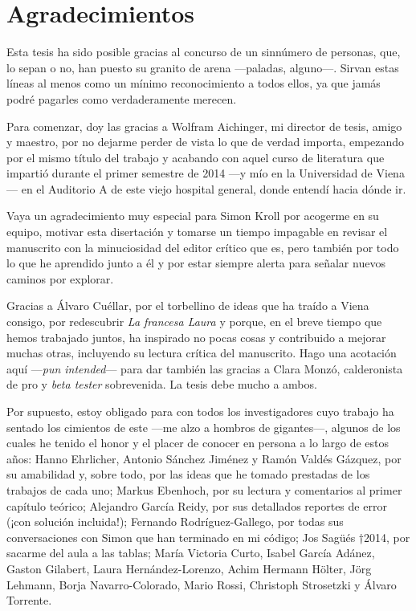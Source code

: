 \chapter*{Agradecimientos}

Esta tesis ha sido posible gracias al concurso de un sinnúmero de personas, que, lo sepan o no, han puesto su granito de arena —paladas, alguno—. Sirvan estas líneas al menos como un mínimo reconocimiento a todos ellos, ya que jamás podré pagarles como verdaderamente merecen. 

Para comenzar, doy las gracias a Wolfram Aichinger, mi director de tesis, amigo y maestro, por no dejarme perder de vista lo que de verdad importa, empezando por el mismo título del trabajo y acabando con aquel curso de literatura que impartió durante el primer semestre de 2014 —y mío en la Universidad de Viena— en el Auditorio A de este viejo hospital general, donde entendí hacia dónde ir.

Vaya un agradecimiento muy especial para Simon Kroll por acogerme en su equipo, motivar esta disertación y tomarse un tiempo impagable en revisar el manuscrito con la minuciosidad del editor crítico que es, pero también por todo lo que he aprendido junto a él y por estar siempre alerta para señalar nuevos caminos por explorar.
 
Gracias a  Álvaro Cuéllar, por el torbellino de ideas que ha traído a Viena consigo, por redescubrir \textit{La francesa Laura} y porque, en el breve tiempo que hemos trabajado juntos, ha inspirado no pocas cosas y contribuido a mejorar muchas otras, incluyendo su lectura crítica del manuscrito. Hago una acotación aquí —\textit{pun intended}— para dar también las gracias a Clara Monzó, calderonista de pro y \textit{beta tester} sobrevenida. La tesis debe mucho a ambos.

Por supuesto, estoy obligado para con todos los investigadores cuyo trabajo ha sentado los cimientos de este —me alzo a hombros de gigantes—, algunos de los cuales he tenido el honor y el placer de conocer en persona a lo largo de estos años: Hanno Ehrlicher, Antonio Sánchez Jiménez y Ramón Valdés Gázquez, por su amabilidad y, sobre todo, por las ideas que he tomado prestadas de los trabajos de cada uno; Markus Ebenhoch, por su lectura y comentarios al primer capítulo teórico; Alejandro García Reidy, por sus detallados reportes de error (¡con solución incluida!); Fernando Rodríguez-Gallego, por todas sus conversaciones con Simon que han terminado en mi código; Jos Sagüés †2014, por sacarme del aula a las tablas; María Victoria Curto, Isabel García Adánez, Gaston Gilabert, Laura Hernández-Lorenzo, Achim Hermann Hölter, Jörg Lehmann, Borja Navarro-Colorado, Mario Rossi, Christoph Strosetzki y Álvaro Torrente.

